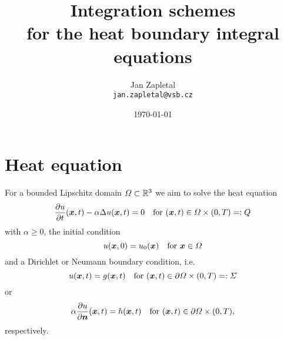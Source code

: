 \documentclass[a4paper,11pt]{article}
\title{\sffamily\bfseries Integration schemes \\ for the heat boundary integral equations}
\author{Jan Zapletal\\\texttt{jan.zapletal@vsb.cz}}
\date{\today}
\begin{document}

\maketitle
\thispagestyle{empty}
\vfill
\tableofcontents
\thispagestyle{empty}
\vfill
\newpage

\pagestyle{plain}
\setcounter{page}{1}

\section{Heat equation}

For a bounded Lipschitz domain $\Omega \subset {\mathbb{R}}^3$ we aim to solve the heat equation
\begin{equation}
  \label{eq:heat_eq}
  \frac{\partial u}{\partial t}(\vx,t) - \alpha \upDelta u(\vx,t) = 0 \quad\text{for } (\vx,t) \in \Omega \times (0,T) =: Q
\end{equation}
with $\alpha \geq 0$, the initial condition
\begin{equation*}
  u({{\bm{x}}},0) = u_0({{\bm{x}}}) \quad\text{for }{\ensuremath{{\bm{x}}}} \in \Omega
\end{equation*}
and a Dirichlet or Neumann boundary condition, i.e.
\begin{equation*}
  u({{\bm{x}}},t) = g({{\bm{x}}},t) \quad\text{for }({{\bm{x}}},t) \in \partial\Omega \times (0,T) =: \Sigma
\end{equation*}
or
\begin{equation*}
  \alpha\frac{\partial u}{\partial {\ensuremath{{\bm{n}}}}}({{\bm{x}}},t) = h({{\bm{x}}},t) \quad\text{for }({{\bm{x}}},t) \in \partial\Omega \times (0,T),
\end{equation*}
respectively.
\end{document}
